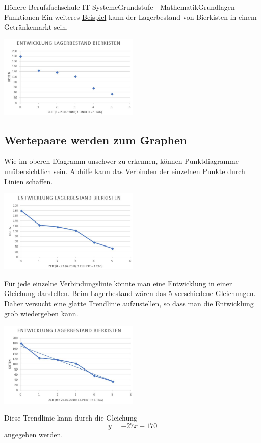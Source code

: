 \documentclass[11pt,twocolumn,oneside,openany,headings=optiontotoc,11pt,numbers=noenddot]{article}
\begin{document}
\begin{worksheet}{Höhere Berufsfachschule IT-Systeme}{Grundstufe - Mathematik}{Grundlagen Funktionen}
		Ein weiteres \underline{Beispiel} kann der Lagerbestand von Bierkisten in einem Getränkemarkt sein.\\
		\par\bigskip\noindent
		\includegraphics[width=0.5\textwidth]{../99_Bilder/bier.jpg}
		\subsection{Wertepaare werden zum Graphen}
		Wie im oberen Diagramm unschwer zu erkennen, können Punktdiagramme unübersichtlich sein. Abhilfe kann das Verbinden der einzelnen Punkte durch Linien schaffen.\\
		\par\bigskip\noindent
		\includegraphics[width=0.5\textwidth]{../99_Bilder/bier1.jpg}\\
		\par\bigskip\noindent
		Für jede einzelne Verbindungslinie könnte man eine Entwicklung in einer Gleichung darstellen. Beim Lagerbestand wären das 5 verschiedene Gleichungen.\\
		Daher versucht eine glatte Trendlinie aufzustellen, so dass man die Entwicklung grob wiedergeben kann.\\
		\par\bigskip\noindent
		\includegraphics[width=0.5\textwidth]{../99_Bilder/bier2.jpg}\\
		\par\bigskip\noindent
		Diese Trendlinie kann durch die Gleichung
		\[y = -27x + 170\]
		angegeben werden.

\end{worksheet}
\end{document}
